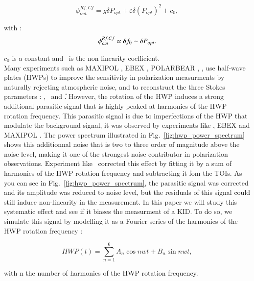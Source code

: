 \begin{equation}
\phi_{out}^{Rf,Cf} = g \delta P_{opt} + \varepsilon \delta (P_{opt})^2 +c_{0},
\label{eq:fit-nl}
\end{equation}

with : 
\begin{equation}
\phi_{out}^{Rf,Cf} \propto \delta f_{0} \sim \delta P_{opt}.\\
\end{equation}

$c_{0}$ is a constant and \eps\ is the non-linearity coefficient. \\

Many experiments such as MAXIPOL \citep{2007ApJ...665...42J}, EBEX \citep{2010SPIE.7741E..1CR}, POLARBEAR \citep{2017JCAP...05..008T},  \citep{2017A&A...599A..34R}, use half-wave plates (HWPs) to improve the sensitivity in polarization measurments by naturally rejecting atmospheric noise, and to reconstruct the three Stokes parameters :  \I , \Q\ and \U . However, the rotation of the HWP induces a strong additional parasitic signal that is highly peaked at harmonics of the HWP rotation frequency. This parasitic signal is due to imperfections of the HWP that modulate the background signal, it was observed by experiments like  \citep{2017A&A...599A..34R}, EBEX \citep{2010SPIE.7741E..1CR} and MAXIPOL \citep{2007ApJ...665...42J}. 
The power spectrum illustrated in Fig.~\ref{fig:hwp_power_spectrum} shows this additionnal noise that is two to three order of magnitude above the noise level, making it one of the strongest noise contributor in polarization observations. Experiment like \nika\ corrected this effect by fitting it by a sum of harmonics of the HWP rotation frequency and subtracting it fom the TOIs. As you can see in Fig.~\ref{fig:hwp_power_spectrum}, the parasitic signal was corrected and its amplitude was reduced to noise level, but the residuals of this signal could still induce non-linearity in the measurement. In this paper we will study this systematic effect and see if it biases the measurment of a KID. To do so, we simulate this signal by modelling it as a Fourier series of the harmonics of the HWP rotation frequency :

\begin{equation}
HWP(t) = \sum_{n=1}^{6} A_{n} \cos nwt + B_{n} \sin nwt , 
\label{eq:hwp-template}
\end{equation}

with n the number of harmonics of the HWP rotation frequency.

